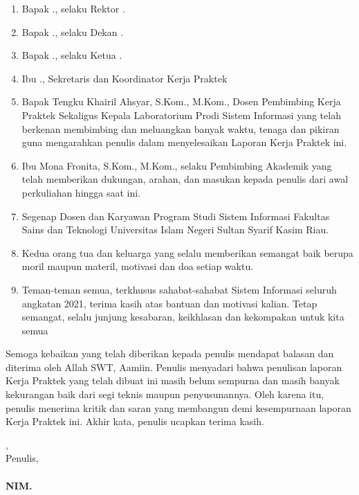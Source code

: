 \begin{enumerate}
	\item Bapak \rektor., selaku Rektor \universitas.
	\item Bapak \dekan., selaku Dekan \fakultas.
	\item Bapak \kaprodi., selaku Ketua \programStudi \space
	      \fakultas \space \universitas.
	\item Ibu \sekretarisprodi., Sekretaris dan Koordinator Kerja Praktek \programStudi \space
	      \fakultas \space \universitas
	\item Bapak Tengku Khairil Ahsyar, S.Kom., M.Kom., Dosen Pembimbing Kerja Praktek Sekaligus Kepala Laboratorium Prodi Sistem Informasi yang telah berkenan membimbing dan meluangkan banyak waktu, tenaga dan pikiran guna mengarahkan penulis dalam menyelesaikan Laporan Kerja Praktek ini. 
    \item Ibu Mona Fronita, S.Kom., M.Kom., selaku Pembimbing Akademik yang telah memberikan dukungan, arahan, dan masukan kepada penulis dari awal perkuliahan hingga saat ini. 
    \item Segenap Dosen dan Karyawan Program Studi Sistem Informasi Fakultas Sains dan Teknologi Universitas Islam Negeri Sultan Syarif Kasim Riau.
    \item Kedua orang tua dan keluarga yang selalu memberikan semangat baik berupa moril maupun materil, motivasi dan doa setiap waktu. 
    \item Teman-teman semua, terkhusus sahabat-sahabat Sistem Informasi seluruh angkatan 2021, terima kasih atas bantuan dan motivasi kalian. Tetap semangat, selalu junjung kesabaran, keikhlasan dan kekompakan untuk kita semua

\end{enumerate}

Semoga kebaikan yang telah diberikan kepada penulis mendapat balasan dan diterima oleh Allah SWT, Aamiin. Penulis menyadari bahwa penulisan laporan Kerja Praktek yang telah dibuat ini masih belum sempurna dan masih banyak kekurangan baik dari segi teknis maupun penyusunannya. Oleh karena itu, penulis menerima kritik dan saran yang membangun demi kesempurnaan laporan Kerja Praktek ini. Akhir kata, penulis ucapkan terima kasih.

\vspace*{0.1cm}

\begin{flushright}
	\kota, \tanggalPersetujuan\\
	Penulis,\\
	\vspace{2cm}
	\textbf{\underline{\penulis}\\
		NIM. \nim}

\end{flushright}

